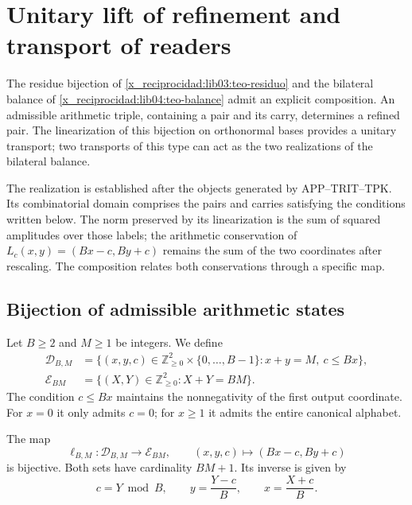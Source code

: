 \chapter{Unitary lift of refinement and transport of readers}
\label{x_reciprocidad:lib05:levantamiento}

The residue bijection of \cref{x_reciprocidad:lib03:teo-residuo} and the
bilateral balance of \cref{x_reciprocidad:lib04:teo-balance} admit an
explicit composition. An admissible arithmetic triple, containing
a pair and its carry, determines a refined pair. The
linearization of this bijection on orthonormal bases provides
a unitary transport; two transports of this type can act
as the two realizations of the bilateral balance.

The realization is established after the objects generated by
APP--TRIT--TPK. Its combinatorial domain comprises the pairs and
carries satisfying the conditions written below. The norm
preserved by its linearization is the sum of squared amplitudes
over those labels; the arithmetic conservation of
\(L_c(x,y)=(Bx-c,By+c)\) remains the sum of the two
coordinates after rescaling. The composition relates both
conservations through a specific map.

\section{Bijection of admissible arithmetic states}
\label{x_reciprocidad:lib05:biyeccion}

Let \(B\geq2\) and \(M\geq1\) be integers. We define
\begin{align}
 \mathcal D_{B,M}
 &=\bigl\{(x,y,c)\in\mathbb Z_{\geq0}^2
                 \times\{0,\ldots,B-1\}:x+y=M,\ c\leq Bx\bigr\},
 \label{x_reciprocidad:lib05:dominio}\\
 \mathcal E_{BM}
 &=\bigl\{(X,Y)\in\mathbb Z_{\geq0}^2:X+Y=BM\bigr\}.
 \label{x_reciprocidad:lib05:codominio}
\end{align}
The condition \(c\leq Bx\) maintains the nonnegativity of the
first output coordinate. For \(x=0\) it only admits
\(c=0\); for \(x\geq1\) it admits the entire canonical alphabet.

\begin{theorem}
\label{x_reciprocidad:lib05:teo-biyeccion}
The map
\begin{equation}
 \ell_{B,M}:\mathcal D_{B,M}\longrightarrow\mathcal E_{BM},
 \qquad (x,y,c)\longmapsto(Bx-c,By+c)
 \label{x_reciprocidad:lib05:mapa-etiquetas}
\end{equation}
is bijective. Both sets have cardinality \(BM+1\). Its inverse
is given by
\begin{equation}
 c=Y\bmod B,\qquad y=\frac{Y-c}{B},\qquad x=\frac{X+c}{B}.
 \label{x_reciprocidad:lib05:inversa-etiquetas}
\end{equation}
\end{theorem}


